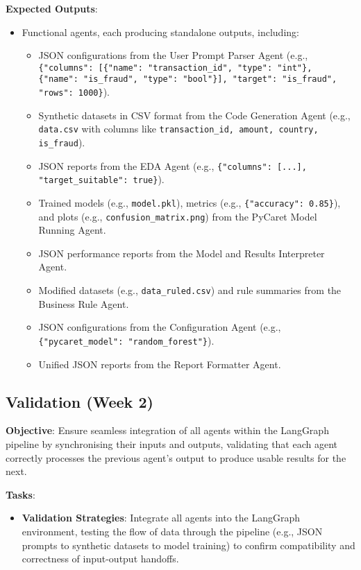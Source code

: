 \documentclass{article}
\begin{document}
\textbf{Expected Outputs}:
\begin{itemize}[label=--]
    \item Functional agents, each producing standalone outputs, including:
    \begin{itemize}[label=$\circ$]
        \item JSON configurations from the User Prompt Parser Agent (e.g., \texttt{\{"columns": [\{"name": "transaction\_id", "type": "int"\}, \{"name": "is\_fraud", "type": "bool"\}], "target": "is\_fraud", "rows": 1000\}}).
        \item Synthetic datasets in CSV format from the Code Generation Agent (e.g., \texttt{data.csv} with columns like \texttt{transaction\_id, amount, country, is\_fraud}).
        \item JSON reports from the EDA Agent (e.g., \texttt{\{"columns": [...], "target\_suitable": true\}}).
        \item Trained models (e.g., \texttt{model.pkl}), metrics (e.g., \texttt{\{"accuracy": 0.85\}}), and plots (e.g., \texttt{confusion\_matrix.png}) from the PyCaret Model Running Agent.
        \item JSON performance reports from the Model and Results Interpreter Agent.
        \item Modified datasets (e.g., \texttt{data\_ruled.csv}) and rule summaries from the Business Rule Agent.
        \item JSON configurations from the Configuration Agent (e.g., \texttt{\{"pycaret\_model": "random\_forest"\}}).
        \item Unified JSON reports from the Report Formatter Agent.
    \end{itemize}
\end{itemize}

\subsection{Validation (Week 2)}
\textbf{Objective}: Ensure seamless integration of all agents within the LangGraph pipeline by synchronising their inputs and outputs, validating that each agent correctly processes the previous agent’s output to produce usable results for the next.

\textbf{Tasks}:
\begin{itemize}[label=--]
    \item \textbf{Validation Strategies}: Integrate all agents into the LangGraph environment, testing the flow of data through the pipeline (e.g., JSON prompts to synthetic datasets to model training) to confirm compatibility and correctness of input-output handoffs.
\end{itemize}
\end{document}
